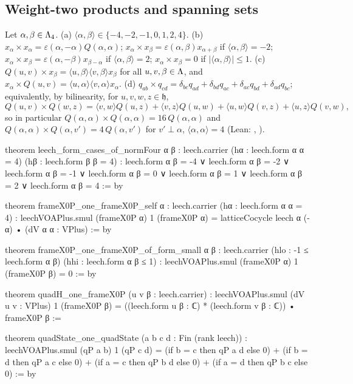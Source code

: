 \subsection{Weight-two products and spanning sets}

\begin{lemma}\label{ch20:lem:products}
Let $\alpha,\beta\in{\Lambda}_4$.  (a) $\langle\alpha,\beta\rangle\in\{-4,-2,-1,0,1,2,4\}$.  (b) $x_\alpha\times x_\alpha=\varepsilon(\alpha,-\alpha)Q(\alpha,\alpha)$;
$x_\alpha\times x_\beta=\varepsilon(\alpha,\beta)x_{\alpha+\beta}$ if $\langle\alpha,\beta\rangle=-2$; $x_\alpha\times x_\beta=\varepsilon(\alpha,-\beta)x_{\beta-\alpha}$ if
$\langle\alpha,\beta\rangle=2$; $x_\alpha\times x_\beta=0$ if $|\langle\alpha,\beta\rangle|\le1$.  (c) $Q(u,v)\times x_\beta=\langle u,\beta\rangle\langle v,\beta\rangle x_\beta$
for all $u,v,\beta\in{\Lambda}$, and $x_\alpha\times Q(u,v)=\langle u,\alpha\rangle\langle v,\alpha\rangle x_\alpha$.  (d)
$q_{ab}\times q_{cd}=\delta_{bc}q_{ad}+\delta_{bd}q_{ac}+\delta_{ac}q_{bd}+\delta_{ad}q_{bc}$; equivalently, by bilinearity, for
$u,v,w,z\in\mathfrak h$,
\begin{equation*}
  Q(u,v)\times Q(w,z)=\langle v,w\rangle Q(u,z)+\langle v,z\rangle Q(u,w)+\langle u,w\rangle Q(v,z)+\langle u,z\rangle Q(v,w),
\end{equation*}
so in particular $Q(\alpha,\alpha)\times Q(\alpha,\alpha)=16\,Q(\alpha,\alpha)$ and $Q(\alpha,\alpha)\times Q(\alpha,v')=4\,Q(\alpha,v')$ for
$v'\perp\alpha$, $\langle\alpha,\alpha\rangle=4$ (Lean: , ).
\end{lemma}
\begin{leancode}
theorem leech_form_cases_of_normFour {α β : leech.carrier}
    (hα : leech.form α α = 4) (hβ : leech.form β β = 4) :
    leech.form α β = -4 ∨ leech.form α β = -2 ∨ leech.form α β = -1 ∨
      leech.form α β = 0 ∨ leech.form α β = 1 ∨ leech.form α β = 2 ∨
      leech.form α β = 4 := by

theorem frameX0P_one_frameX0P_self {α : leech.carrier} (hα : leech.form α α = 4) :
    leechVOAPlus.smul (frameX0P α) 1 (frameX0P α) =
      latticeCocycle leech α (-α) • (dV α α : VPlus) := by

theorem frameX0P_one_frameX0P_of_form_small {α β : leech.carrier}
    (hlo : -1 ≤ leech.form α β) (hhi : leech.form α β ≤ 1) :
    leechVOAPlus.smul (frameX0P α) 1 (frameX0P β) = 0 := by

theorem quadH_one_frameX0P (u v β : leech.carrier) :
    leechVOAPlus.smul (dV u v : VPlus) 1 (frameX0P β) =
      ((leech.form u β : ℂ) * (leech.form v β : ℂ)) • frameX0P β :=

theorem quadState_one_quadState (a b c d : Fin (rank leech)) :
    leechVOAPlus.smul (qP a b) 1 (qP c d) =
      (if b = c then qP a d else 0) + (if b = d then qP a c else 0) +
      (if a = c then qP b d else 0) + (if a = d then qP b c else 0) := by
\end{leancode}
